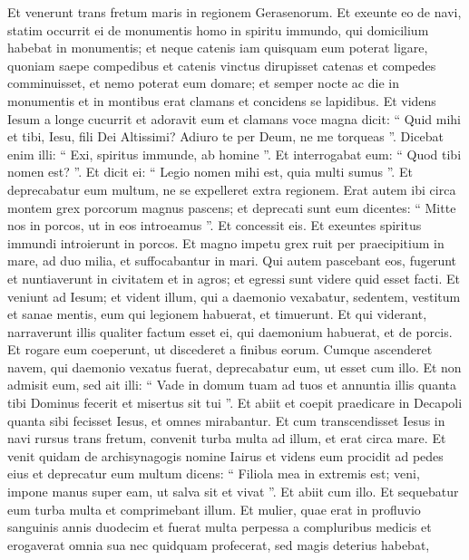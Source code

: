 \begin{biblechapter}
\begin{biblechapter}
\begin{biblechapter}
\begin{biblechapter}
\begin{biblechapter}
\verse Et venerunt trans fretum maris in regionem Gerasenorum. 
\verse Et exeunte eo de navi, statim occurrit ei de monumentis homo in spiritu immundo, 
\verse qui domicilium habebat in monumentis; et neque catenis iam quisquam eum poterat ligare, 
\verse quoniam saepe compedibus et catenis vinctus dirupisset catenas et compedes comminuisset, et nemo poterat eum domare; 
\verse et semper nocte ac die in monumentis et in montibus erat clamans et concidens se lapidibus. 
\verse Et videns Iesum a longe cucurrit et adoravit eum 
\verse et clamans voce magna dicit: “ Quid mihi et tibi, Iesu, fili Dei Altissimi? Adiuro te per Deum, ne me torqueas ”. 
\verse Dicebat enim illi: “ Exi, spiritus immunde, ab homine ”. 
\verse Et interrogabat eum: “ Quod tibi nomen est? ”. Et dicit ei: “ Legio nomen mihi est, quia multi sumus ”. 
\verse Et deprecabatur eum multum, ne se expelleret extra regionem.
 \verse Erat autem ibi circa montem grex porcorum magnus pascens; 
\verse et deprecati sunt eum dicentes: “ Mitte nos in porcos, ut in eos introeamus ”. 
\verse Et concessit eis. Et exeuntes spiritus immundi introierunt in porcos. Et magno impetu grex ruit per praecipitium in mare, ad duo milia, et suffocabantur in mari. 
\verse Qui autem pascebant eos, fugerunt et nuntiaverunt in civitatem et in agros; et egressi sunt videre quid esset facti. 
\verse Et veniunt ad Iesum; et vident illum, qui a daemonio vexabatur, sedentem, vestitum et sanae mentis, eum qui legionem habuerat, et timuerunt. 
\verse Et qui viderant, narraverunt illis qualiter factum esset ei, qui daemonium habuerat, et de porcis. 
\verse Et rogare eum coeperunt, ut discederet a finibus eorum. 
\verse Cumque ascenderet navem, qui daemonio vexatus fuerat, deprecabatur eum, ut esset cum illo. 
\verse Et non admisit eum, sed ait illi: “ Vade in domum tuam ad tuos et annuntia illis quanta tibi Dominus fecerit et misertus sit tui ”. 
\verse Et abiit et coepit praedicare in Decapoli quanta sibi fecisset Iesus, et omnes mirabantur.
 \verse Et cum transcendisset Iesus in navi rursus trans fretum, convenit turba multa ad illum, et erat circa mare. 
\verse Et venit quidam de archisynagogis nomine Iairus et videns eum procidit ad pedes eius 
\verse et deprecatur eum multum dicens: “ Filiola mea in extremis est; veni, impone manus super eam, ut salva sit et vivat ”. 
\verse Et abiit cum illo. Et sequebatur eum turba multa et comprimebant illum.
 \verse Et mulier, quae erat in profluvio sanguinis annis duodecim 
\verse et fuerat multa perpessa a compluribus medicis et erogaverat omnia sua nec quidquam profecerat, sed magis deterius habebat, 

\end{biblechapter}
\end{biblechapter}
\end{biblechapter}
\end{biblechapter}
\end{biblechapter}
